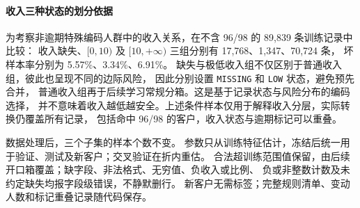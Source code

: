 \paragraph{收入三种状态的划分依据}
为考察非逾期特殊编码人群中的收入关系，在不含 96/98 的 89,839 条训练记录中比较：
收入缺失、$[0,10)$ 及 $[10,+\infty)$ 三组分别有 17,768、1,347、70,724 条，
坏样本率分别为 5.57\%、3.34\%、6.91\%。
缺失与极低收入组不仅区别于普通收入组，彼此也呈现不同的边际风险，
因此分别设置 \texttt{MISSING} 和 \texttt{LOW} 状态，避免预先合并，
普通收入组再于后续学习常规分箱。这是基于记录状态与风险分布的编码选择，
并不意味着收入越低越安全。上述条件样本仅用于解释收入分层，实际转换仍覆盖所有记录，
包括命中 96/98 的客户，收入状态与逾期标记可以重叠。

数据处理后，三个子集的样本个数不变。
参数只从训练特征估计，冻结后统一用于验证、测试及新客户；交叉验证在折内重估。
合法超训练范围值保留，由后续开口箱覆盖；缺字段、非法格式、无穷值、负收入或比例、
负或非整数计数及未约定缺失均报字段级错误，不静默删行。
新客户无需标签；完整规则清单、变动人数和标记重叠记录随代码保存。
